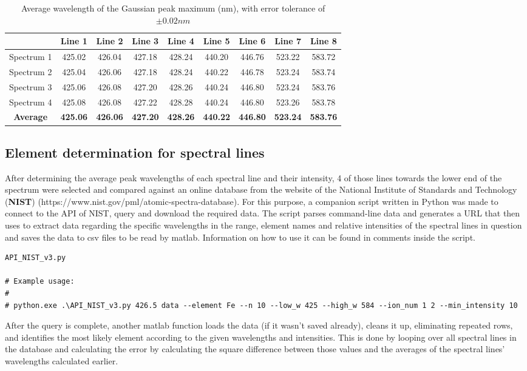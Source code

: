 \begin{table}[H]
    \centering
    \caption{Average wavelength of the Gaussian peak maximum (nm), with error tolerance of $\pm 0.02 nm$}
    \begin{tabular}{|c|c|c|c|c|c|c|c|c|}
    \centering
    \textbf{}   & \textbf{Line 1} & \textbf{Line 2} &  \textbf{Line 3} & \textbf{Line 4} & \textbf{Line 5} & \textbf{Line 6} & \textbf{Line 7} & \textbf{Line 8}\\ \hline \hline
    Spectrum 1   & 425.02    & 426.04    & 427.18 & 428.24  & 440.20 & 446.76 & 523.22 & 583.72 \\ \hline   
    Spectrum 2   & 425.04    & 426.06    & 427.18 & 428.24  & 440.22 & 446.78 & 523.24 & 583.74\\ \hline
    Spectrum 3   & 425.06    & 426.08    & 427.20 & 428.26  & 440.24 & 446.80 & 523.24 & 583.76\\ \hline
    Spectrum 4   & 425.08    & 426.08    & 427.22 & 428.28  & 440.24 & 446.80 & 523.26 & 583.78\\ \hline
    \textbf{Average}     & \textbf{425.06}    & \textbf{426.06}    & \textbf{427.20} & \textbf{428.26}  & \textbf{440.22} & \textbf{446.80} & \textbf{523.24 }& \textbf{583.76}
    \end{tabular}
    \label{tab:table3}
\end{table}

\subsection{Element determination for spectral lines}
After determining the average peak wavelengths of each spectral line and their intensity, 4 of those lines towards the lower end of the spectrum were selected and compared against an online database from the website of the National Institute of Standards and Technology (\textbf{NIST})\cite{NIST} (https://www.nist.gov/pml/atomic-spectra-database). For this purpose, a companion script written in Python was made to connect to the API of NIST, query and download the required data.
The script parses command-line data and generates a URL that then uses to extract data regarding the specific wavelengths in the range, element names and relative intensities of the spectral lines in question and saves the data to csv files to be read by matlab. Information on how to use it can be found in comments inside the script.
\begin{lstlisting}
API_NIST_v3.py

# Example usage:
#
# python.exe .\API_NIST_v3.py 426.5 data --element Fe --n 10 --low_w 425 --high_w 584 --ion_num 1 2 --min_intensity 10
\end{lstlisting}
After the query is complete, another matlab function loads the data (if it wasn't saved already), cleans it up, eliminating repeated rows, and identifies the most likely element according to the given wavelengths and intensities. This is done by looping over all spectral lines in the database and calculating the error by calculating the square difference between those values and the averages of the spectral lines' wavelengths calculated earlier.

